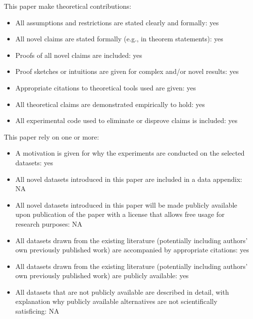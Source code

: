 \documentclass[letterpaper]{article} %
\begin{document}
This paper make theoretical contributions:
\begin{itemize}
	\item All assumptions and restrictions are stated clearly and formally: yes
	\item All novel claims are stated formally (e.g., in theorem statements): yes
	\item Proofs of all novel claims are included: yes
	\item Proof sketches or intuitions are given for complex and/or novel results: yes
	\item Appropriate citations to theoretical tools used are given: yes
	\item All theoretical claims are demonstrated empirically to hold: yes
	\item All experimental code used to eliminate or disprove claims is included: yes
\end{itemize}

This paper rely on one or more:
\begin{itemize}
	\item A motivation is given for why the experiments are conducted on the selected datasets: yes
	\item All novel datasets introduced in this paper are included in a data appendix: NA
	\item All novel datasets introduced in this paper will be made publicly available upon publication of the paper with a license that allows free usage for research purposes: NA
	\item All datasets drawn from the existing literature (potentially including authors’ own previously published work) are accompanied by appropriate citations: yes
	\item All datasets drawn from the existing literature (potentially including authors’ own previously published work) are publicly available: yes
	\item All datasets that are not publicly available are described in detail, with explanation why publicly available alternatives are not scientifically satisficing: NA
\end{itemize}
\end{document}

